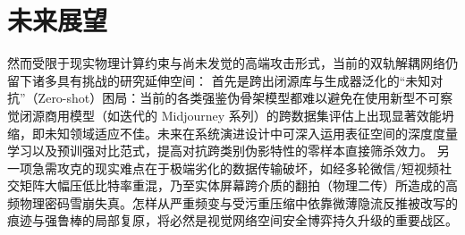\documentclass[UTF8, a4paper, 12pt]{ctexrep}
\begin{document}
\section{未来展望}
然而受限于现实物理计算约束与尚未发觉的高端攻击形式，当前的双轨解耦网络仍留下诸多具有挑战的研究延伸空间：
首先是跨出闭源库与生成器泛化的“未知对抗”（Zero-shot）困局：当前的各类强鉴伪骨架模型都难以避免在使用新型不可察觉闭源商用模型（如迭代的 Midjourney 系列）的跨数据集评估上出现显著效能坍缩，即未知领域适应不佳。未来在系统演进设计中可深入运用表征空间的深度度量学习以及预训强对比范式，提高对抗跨类别伪影特性的零样本直接筛杀效力。
另一项急需攻克的现实难点在于极端劣化的数据传输破坏，如经多轮微信/短视频社交矩阵大幅压低比特率重混，乃至实体屏幕跨介质的翻拍（物理二传）所造成的高频物理密码雪崩失真。怎样从严重频变与受污重压缩中依靠微薄隐流反推被改写的痕迹与强鲁棒的局部复原，将必然是视觉网络空间安全博弈持久升级的重要战区。
\end{document}
